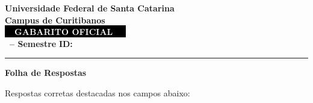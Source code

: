 \documentclass[10pt,a4paper]{article}
\makeatletter
\newcommand{\myCourse}{\@Course}
\newcommand{\mySemester}{\@Semester}
\newcommand{\myID}{\@ID}
\makeatother
\begin{document}
\thispagestyle{empty}
{\sf
\begin{center}
    \textbf{\LARGE Universidade Federal de Santa Catarina}\\[0.15cm]
    \textbf{\Large Campus de Curitibanos}\\[0.5cm]

    \colorbox{black}{\textcolor{white}{\textbf{\Large \ \ GABARITO OFICIAL \ \ }}}\\[0.5cm]

    \textbf{\large \myCourse \ -- Semestre \mySemester} \hfill \textbf{ID: \myID}
\end{center}

\vspace{0.2cm}
\hrule
\vspace{0.8cm}

\textbf{\Large Folha de Respostas}

\vspace{0.3cm}
Respostas corretas destacadas nos campos abaixo:
\vspace{0.5cm}

}

\newpage

\begin{enumerate}
\setlength{\itemsep}{1.5em}
\end{enumerate}
\end{document}
